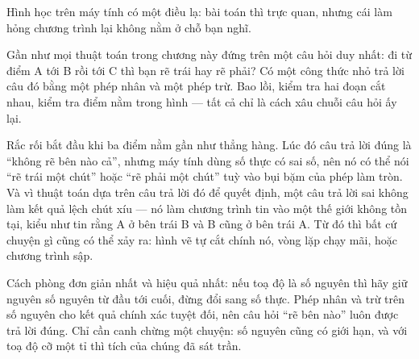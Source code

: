 \documentclass[../../algorithm.tex]{subfiles}
\begin{document}
\begin{dongian}
Hình học trên máy tính có một điều lạ: bài toán thì trực quan, nhưng cái làm hỏng chương trình lại không nằm ở chỗ bạn nghĩ.

Gần như mọi thuật toán trong chương này đứng trên một câu hỏi duy nhất: đi từ điểm A tới B rồi tới C thì bạn rẽ trái hay rẽ phải? Có một công thức nhỏ trả lời câu đó bằng một phép nhân và một phép trừ. Bao lồi, kiểm tra hai đoạn cắt nhau, kiểm tra điểm nằm trong hình --- tất cả chỉ là cách xâu chuỗi câu hỏi ấy lại.

Rắc rối bắt đầu khi ba điểm nằm gần như thẳng hàng. Lúc đó câu trả lời đúng là ``không rẽ bên nào cả'', nhưng máy tính dùng số thực có sai số, nên nó có thể nói ``rẽ trái một chút'' hoặc ``rẽ phải một chút'' tuỳ vào bụi bặm của phép làm tròn. Và vì thuật toán dựa trên câu trả lời đó để quyết định, một câu trả lời sai không làm kết quả lệch chút xíu --- nó làm chương trình tin vào một thế giới không tồn tại, kiểu như tin rằng A ở bên trái B và B cũng ở bên trái A. Từ đó thì bất cứ chuyện gì cũng có thể xảy ra: hình vẽ tự cắt chính nó, vòng lặp chạy mãi, hoặc chương trình sập.

Cách phòng đơn giản nhất và hiệu quả nhất: nếu toạ độ là số nguyên thì hãy giữ nguyên số nguyên từ đầu tới cuối, đừng đổi sang số thực. Phép nhân và trừ trên số nguyên cho kết quả chính xác tuyệt đối, nên câu hỏi ``rẽ bên nào'' luôn được trả lời đúng. Chỉ cần canh chừng một chuyện: số nguyên cũng có giới hạn, và với toạ độ cỡ một tỉ thì tích của chúng đã sát trần.
\end{dongian}
\end{document}
